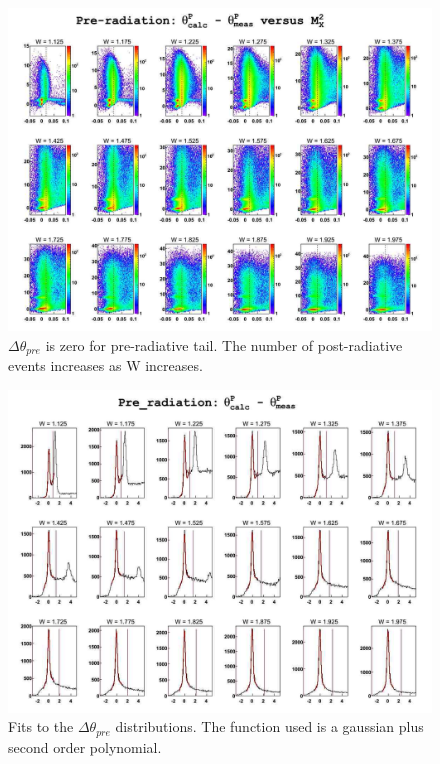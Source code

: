 \begin{landscape}
	\begin{figure}[ht]
	\centering
		\includegraphics[width=1.15\textheight]{img/dth2_epXmm2_no_cut.jpg}
		\caption{$\Delta\theta_{pre}$ is zero for pre-radiative tail. The number of post-radiative
		events increases as W increases.}
	\label{fig:dth2_epXmm2_no_cut}
	\end{figure}
\end{landscape}
\clearpage\newpage

\begin{landscape}
	\begin{figure}[ht]
	\centering
		\includegraphics[width=1.15\textheight]{img/dth2_no_cut.jpg}
		\caption{Fits to the $\Delta\theta_{pre}$ distributions. The function used is a gaussian plus
		second order polynomial.}
		\label{fig:dth2_no_cut}
	\end{figure}
\end{landscape}


